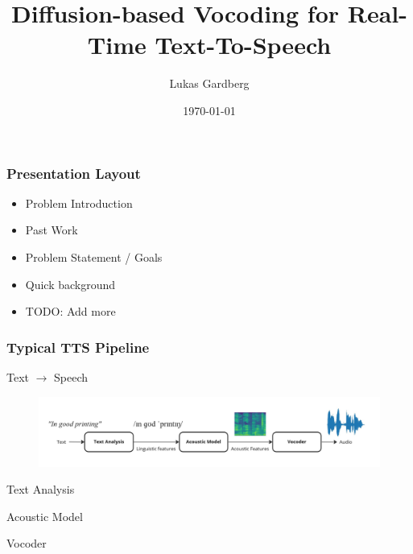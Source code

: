 \documentclass{beamer}
\title{Diffusion-based Vocoding for Real-Time Text-To-Speech}
\author{Lukas Gardberg}
\institute{LTH}
\date{\today}
\begin{document}
\frame{\titlepage}

\begin{frame}
\frametitle{Presentation Layout}
\begin{itemize}
    \item Problem Introduction
    \item Past Work
    \item Problem Statement / Goals
    \item Quick background
    \item TODO: Add more
\end{itemize}
\end{frame}


\begin{frame}
\frametitle{Typical TTS Pipeline}

\vspace{1cm}

\begin{center}
{\large
    Text \quad $\longrightarrow$ \quad Speech
}
\end{center}

\vspace{1cm}

\begin{figure}[H]
    \centering
    \includegraphics[width=1\textwidth]{images/TTS.jpg}
\end{figure}

\vspace{1cm}

\begin{multicols}{3}
    \begin{center}

    Text Analysis

    \vfill\null
    \columnbreak

    Acoustic Model

    \vfill\null
    \columnbreak

    Vocoder

    \end{center}
\end{multicols}

\end{frame}
\end{document}
